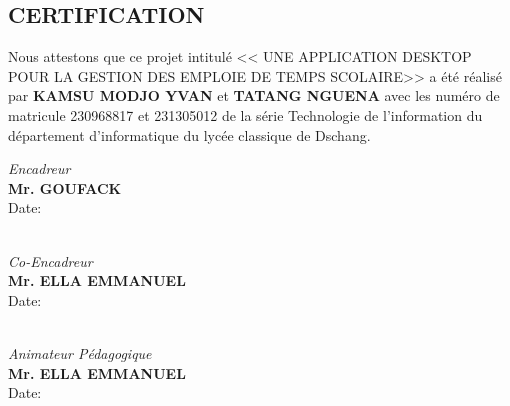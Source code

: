 \documentclass[english,12pt,a4paper]{report}
\begin{document}
\begin{spacing}{1.5}
\chapter*{CERTIFICATION}
\hspace{1.2cm}
Nous attestons que ce projet intitulé << UNE APPLICATION DESKTOP POUR LA GESTION DES EMPLOIE DE TEMPS SCOLAIRE>> a été réalisé par \textbf{KAMSU MODJO YVAN} et \textbf{TATANG NGUENA} avec les numéro de matricule 230968817 et 231305012 de la série Technologie de l'information du département d'informatique du lycée classique de Dschang.
\begin{center}
	\vspace{0.2cm}
	\emph{Encadreur}\\
	\vspace{0.2cm}
	\textbf{Mr. GOUFACK}\\
	\vspace{0.2cm}
	Date:
	\\
	\vspace{0.2cm}
	\emph{Co-Encadreur}\\
	\vspace{0.2cm}
	\textbf{Mr. ELLA EMMANUEL}\\
	\vspace{0.2cm}
	Date:
	\\
	\vspace{0.5cm}
	\emph{Animateur Pédagogique}\\
	\vspace{0.2cm}
	\textbf{Mr. ELLA EMMANUEL}\\
	\vspace{0.2cm}
	Date:
\end{center}

\end{spacing}
\end{document}
